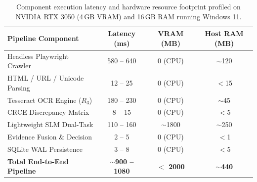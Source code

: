 \documentclass{article}
\begin{document}
\begin{table}[h]
\centering
\small
\caption{Component execution latency and hardware resource footprint profiled on NVIDIA RTX 3050 (4\,GB VRAM) and 16\,GB RAM running Windows 11.}
\label{tab:hardware_budget}
\begin{tabular}{lccc}
\toprule
\textbf{Pipeline Component} & \textbf{Latency (ms)} & \textbf{VRAM (MB)} & \textbf{Host RAM (MB)} \\
\midrule
Headless Playwright Crawler    & 580 -- 640 & 0 (CPU)    & $\sim$120 \\
HTML / URL / Unicode Parsing   & 12 -- 25   & 0 (CPU)    & $<$15 \\
Tesseract OCR Engine ($R_3$)   & 180 -- 230 & 0 (CPU)    & $\sim$45 \\
CRCE Discrepancy Matrix        & 8 -- 15    & 0 (CPU)    & $<$5 \\
Lightweight SLM Dual-Task      & 110 -- 160 & $\sim$1800 & $\sim$250 \\
Evidence Fusion \& Decision    & 2 -- 5     & 0 (CPU)    & $<$1 \\
SQLite WAL Persistence         & 3 -- 8     & 0 (CPU)    & $<$5 \\
\midrule
\textbf{Total End-to-End Pipeline} & \textbf{$\sim$900 -- 1080} & \textbf{$<$ 2000} & \textbf{$\sim$440} \\
\bottomrule
\end{tabular}
\end{table}
\end{document}
